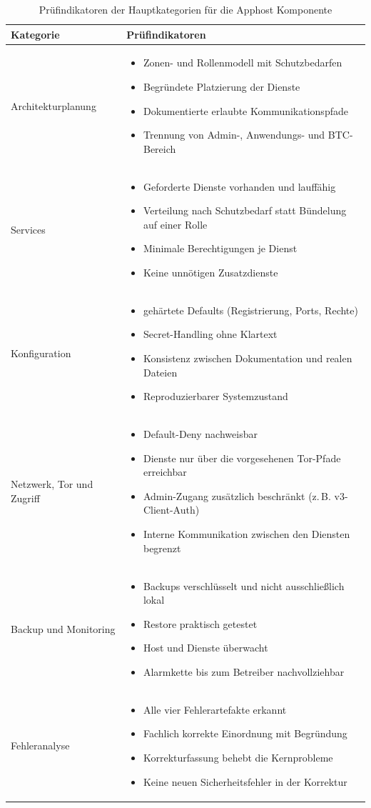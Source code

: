 \begin{table}[H]
\centering
\small
\newcommand{\indikatoren}[1]{\begin{itemize}[nosep,topsep=0pt,partopsep=0pt,leftmargin=1.2em]#1\end{itemize}}
\begin{tabular}{p{} p{}}
\hline
\textbf{Kategorie} & \textbf{Prüfindikatoren} \\
\hline
Architekturplanung &
\indikatoren{
\item Zonen- und Rollenmodell mit Schutzbedarfen
\item Begründete Platzierung der Dienste
\item Dokumentierte erlaubte Kommunikationspfade
\item Trennung von Admin-, Anwendungs- und \ac{BTC}-Bereich
} \\
\addlinespace
Services &
\indikatoren{
\item Geforderte Dienste vorhanden und lauffähig
\item Verteilung nach Schutzbedarf statt Bündelung auf einer Rolle
\item Minimale Berechtigungen je Dienst
\item Keine unnötigen Zusatzdienste
} \\
\addlinespace
Konfiguration &
\indikatoren{
\item gehärtete Defaults (Registrierung, Ports, Rechte)
\item Secret-Handling ohne Klartext
\item Konsistenz zwischen Dokumentation und realen Dateien
\item Reproduzierbarer Systemzustand
} \\
\addlinespace
Netzwerk, Tor und Zugriff &
\indikatoren{
\item Default-Deny nachweisbar
\item Dienste nur über die vorgesehenen Tor-Pfade erreichbar
\item Admin-Zugang zusätzlich beschränkt (z.\,B. v3-Client-Auth)
\item Interne Kommunikation zwischen den Diensten begrenzt
} \\
\addlinespace
Backup und Monitoring &
\indikatoren{
\item Backups verschlüsselt und nicht ausschließlich lokal
\item Restore praktisch getestet
\item Host und Dienste überwacht
\item Alarmkette bis zum Betreiber nachvollziehbar
} \\
\addlinespace
Fehleranalyse &
\indikatoren{
\item Alle vier Fehlerartefakte erkannt
\item Fachlich korrekte Einordnung mit Begründung
\item Korrekturfassung behebt die Kernprobleme
\item Keine neuen Sicherheitsfehler in der Korrektur
} \\
\hline
\end{tabular}
\caption{Prüfindikatoren der Hauptkategorien für die Apphost Komponente}
\label{tab:kategorien-indikatoren}
\end{table}

